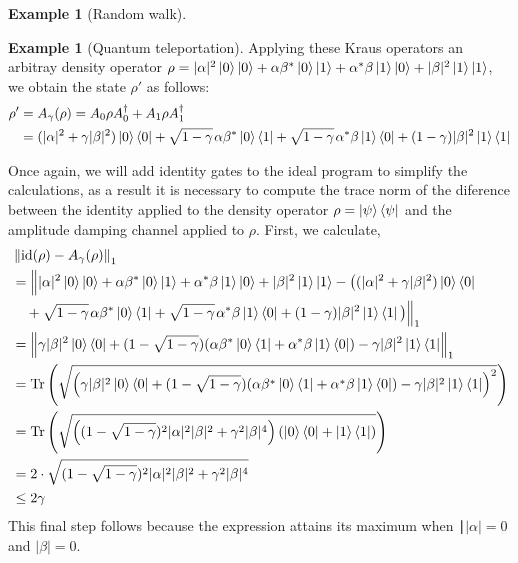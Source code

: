\documentclass[10pt,a4paper]{amsart}
\theoremstyle{definition}
\theoremstyle{definition}
\newtheorem{example}[definition]{Example}
\theoremstyle{definition}
\theoremstyle{definition}
\theoremstyle{definition}
\theoremstyle{definition}
\begin{document}
\begin{example}[Random walk]
\begin{example}[Quantum teleportation]
Applying these Kraus operators an arbitray density operator $\rho=|\alpha|^{2} \ket{0} \ket{0} + \alpha \beta^{*} \ket{0} \ket{1} + \alpha^{*} \beta \ket{1} \ket{0} + |\beta|^{2} \ket{1} \ket{1}$, we obtain the state $\rho'$ as follows:
\begin{align*}
     \rho' & = A_\gamma(\rho) =  A_{0} \rho A_{0}^{\dag} + A_{1} \rho A_{1}^{\dag} \\
     & = (|\alpha|^{2} + \gamma |\beta|^{2}) \ket{0}\bra{0} + \sqrt{1-\gamma} \hspace{1pt} \alpha \beta^{*} \ket{0}\bra{1} + \sqrt{1-\gamma} \hspace{1pt} \alpha^{*} \beta \ket{1}\bra{0} + (1-\gamma) |\beta|^{2} \ket{1}\bra{1}
\end{align*}

Once again, we will add identity gates to the ideal program to simplify the calculations, as a result it is necessary to compute the trace norm of the diference between the identity applied to the density operator $\rho = \ket{\psi} \bra{\psi}$ and the amplitude damping channel applied to $\rho$.
First, we calculate, 
\begin{align*}
  & \left\lVert  \mathrm{id}(\rho) - A_{\gamma}(\rho) \right\rVert_{1} \\
  & =    \Big\lVert  |\alpha|^{2} \ket{0} \ket{0} + \alpha \beta^{*} \ket{0} \ket{1} + \alpha^{*} \beta \ket{1} \ket{0} + |\beta|^{2} \ket{1} \ket{1}  - \big((|\alpha|^{2} + \gamma |\beta|^{2}) \ket{0}\bra{0} \\ 
  & \hspace{10pt}  +  \sqrt{1-\gamma} \hspace{1pt} \alpha \beta^{*} \ket{0}\bra{1} + \sqrt{1-\gamma} \hspace{1pt} \alpha^{*} \beta \ket{1}\bra{0} + (1-\gamma) |\beta|^{2} \ket{1}\bra{1}\big) \Big\rVert_1 \\
   & = \left\lVert \gamma |\beta|^{2} \ket{0} \bra{0} + (1-\sqrt{1-\gamma}) (\alpha \beta^{*} \ket{0} \bra{1} + \alpha^{*} \beta \ket{1} \bra{0}) - \gamma |\beta|^{2} \ket{1} \bra{1} \right\rVert_{1} \\
   & = \text{Tr} \left( \sqrt{\left( \gamma |\beta|^{2} \ket{0} \bra{0} + (1-\sqrt{1-\gamma}) (\alpha \beta^{*} \ket{0} \bra{1} + \alpha^{*} \beta \ket{1} \bra{0}) - \gamma |\beta|^{2} \ket{1} \bra{1}  \right)^2}\right) \\
   & = \text{Tr} \left( \sqrt{\left( (1-\sqrt{1-\gamma})^{2} |\alpha|^{2}|\beta|^{2} + \gamma^{2} |\beta|^{4} \right) (\ket{0} \bra{0} + \ket{1} \bra{1} ) } \right) \\
   & = 2 \cdot \sqrt{  (1-\sqrt{1-\gamma})^{2} |\alpha|^{2}|\beta|^{2} + \gamma^{2} |\beta|^{4}} \\
   & \leq 2 \gamma
\end{align*}
This final step follows because the expression attains its maximum when 
∣$|\alpha|=0 $ and $|\beta|=0.$


\end{example}
\end{example}
\end{document}
